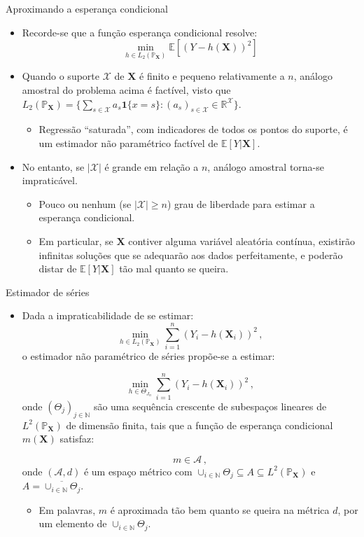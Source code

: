 \documentclass[11pt]{beamer}
\begin{document}
	\begin{frame}{Aproximando a esperança condicional}
		\begin{itemize}
			\item Recorde-se que a função esperança condicional resolve:
			$$\min_{h \in L_2(\mathbb{P}_{\boldsymbol{X}})} \mathbb{E}[(Y-h(\boldsymbol{X}))^2]$$
			\item Quando o suporte $\mathcal{X}$ de $\boldsymbol{X}$ é finito e pequeno relativamente a $n$, análogo amostral do problema acima é factível, visto que $L_2(\mathbb{P}_{\boldsymbol{X}}) = \{\sum_{s \in \mathcal{X}} a_s \mathbf{1}\{x = s\}: (a_s)_{s\in \mathcal{X}} \in \mathbb{R}^{\mathcal{X}}\}$.
			\begin{itemize}
				\item Regressão ``saturada'', com indicadores de todos os pontos do suporte, é um estimador não paramétrico factível de $\mathbb{E}[Y|\boldsymbol{X}]$.
			\end{itemize}
			\item No entanto, se $|\mathcal{X}|$ é grande em relação a $n$, análogo amostral torna-se impraticável.
			\begin{itemize}
				\item Pouco ou nenhum (se $|\mathcal{X}|\geq n$) grau de liberdade para estimar a esperança condicional.
				\item Em particular, se $\boldsymbol{X}$ contiver alguma variável aleatória contínua, existirão infinitas soluções que se adequarão aos dados perfeitamente, e poderão distar de $\mathbb{E}[Y|\boldsymbol{X}]$ tão mal quanto se queira.
			\end{itemize}
		\end{itemize}
	\end{frame}
	
	\begin{frame}{Estimador de séries}
		\begin{itemize}
			\item Dada a impraticabilidade de se estimar:
				$$\min_{h \in L_2(\mathbb{P}_{\boldsymbol{X}})} \sum_{i=1}^n (Y_i-h(\boldsymbol{X}_i))^2 \, ,$$
				o estimador não paramétrico de {\color{red}séries} propõe-se a estimar:
				
				$$\min_{h \in \Theta_{J_n}} \sum_{i=1}^n (Y_i-h(\boldsymbol{X}_i))^2 \, ,$$
				onde $(\Theta_{j})_{j \in \mathbb{N}}$ são uma sequência crescente de subespaços lineares de $L^2(\mathbb{P}_{\boldsymbol{X}})$ de {\color{blue}dimensão finita}, tais que a função de esperança condicional $m(\boldsymbol{X})$ satisfaz:
				
				$$m \in  \mathcal{A}\,,$$
				onde $(\mathcal{A},d)$ é um espaço métrico com $\cup_{i \in \mathbb{N}} \Theta_j \subseteq A \subseteq L^2(\mathbb{P}_{\boldsymbol{X}})$ e $A = \overline{\cup_{i \in \mathbb{N}} \Theta_j}$.
				\begin{itemize}
					\item Em palavras, $m$ é aproximada tão bem quanto se queira na métrica $d$, por um elemento de $\cup_{i \in \mathbb{N}} \Theta_j$.
				\end{itemize}
		\end{itemize}
	\end{frame}
	
\end{document}
